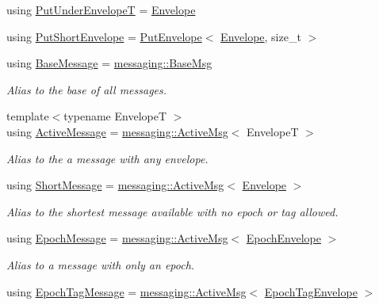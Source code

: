\begin{DoxyCompactItemize}
\item 
using \hyperlink{namespacevt_a233c004b26ccd826ef10686169371e01}{Put\+Under\+EnvelopeT} = \hyperlink{namespacevt_aa9c8cc094b5361482021d63012987814}{Envelope}
\item 
using \hyperlink{namespacevt_a8d7a7de9e76bfea1600009a775b7298c}{Put\+Short\+Envelope} = \hyperlink{structvt_1_1_put_envelope}{Put\+Envelope}$<$ \hyperlink{namespacevt_aa9c8cc094b5361482021d63012987814}{Envelope}, size\+\_\+t $>$
\item 
using \hyperlink{namespacevt_ac34f95a5e2b8109b55bfba52b074443d}{Base\+Message} = \hyperlink{structvt_1_1messaging_1_1_base_msg}{messaging\+::\+Base\+Msg}
\begin{DoxyCompactList}\small\item\em Alias to the base of all messages. \end{DoxyCompactList}\item 
{\footnotesize template$<$typename EnvelopeT $>$ }\\using \hyperlink{namespacevt_a00eb67bd138395b6a4f744fab3fa0678}{Active\+Message} = \hyperlink{structvt_1_1messaging_1_1_active_msg}{messaging\+::\+Active\+Msg}$<$ EnvelopeT $>$
\begin{DoxyCompactList}\small\item\em Alias to the a message with any envelope. \end{DoxyCompactList}\item 
using \hyperlink{namespacevt_a1125ac1da6c0bbf141e0ea0739d7602d}{Short\+Message} = \hyperlink{structvt_1_1messaging_1_1_active_msg}{messaging\+::\+Active\+Msg}$<$ \hyperlink{namespacevt_aa9c8cc094b5361482021d63012987814}{Envelope} $>$
\begin{DoxyCompactList}\small\item\em Alias to the shortest message available with no epoch or tag allowed. \end{DoxyCompactList}\item 
using \hyperlink{namespacevt_ad67368ffae52d7325002586b41bb150e}{Epoch\+Message} = \hyperlink{structvt_1_1messaging_1_1_active_msg}{messaging\+::\+Active\+Msg}$<$ \hyperlink{namespacevt_af71a025689a3da5037785b53a7a8e78c}{Epoch\+Envelope} $>$
\begin{DoxyCompactList}\small\item\em Alias to a message with only an epoch. \end{DoxyCompactList}\item 
using \hyperlink{namespacevt_a4ccc13b06bff8a4a35426a1a082a95a9}{Epoch\+Tag\+Message} = \hyperlink{structvt_1_1messaging_1_1_active_msg}{messaging\+::\+Active\+Msg}$<$ \hyperlink{namespacevt_af23b58014ced6898422213a0e5e6a27a}{Epoch\+Tag\+Envelope} $>$

\end{DoxyCompactItemize}
